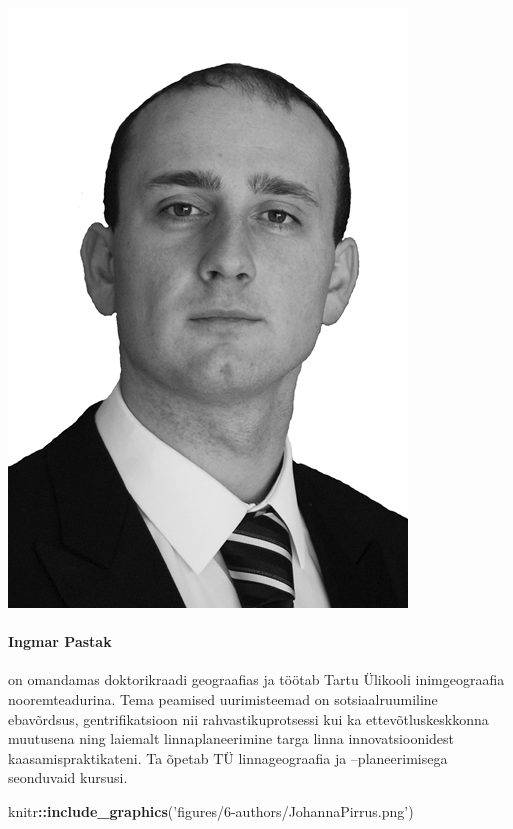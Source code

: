 \documentclass[estonian,]{article}
\newenvironment{Shaded}{\begin{snugshade}}{\end{snugshade}}
\newcommand{\KeywordTok}[1]{\textcolor[rgb]{0.13,0.29,0.53}{\textbf{#1}}}
\newcommand{\NormalTok}[1]{#1}
\newcommand{\OperatorTok}[1]{\textcolor[rgb]{0.81,0.36,0.00}{\textbf{#1}}}
\newcommand{\StringTok}[1]{\textcolor[rgb]{0.31,0.60,0.02}{#1}}
\let\oldparagraph\paragraph
\renewcommand{\paragraph}[1]{\oldparagraph{#1}\mbox{}}
\begin{document}
\begin{flushleft}\includegraphics[width=0.5\linewidth]{figures/6-authors/IngmarPastak} \end{flushleft}

\hypertarget{ingmar-pastak}{%
\paragraph{Ingmar Pastak}\label{ingmar-pastak}}

on omandamas doktorikraadi geograafias ja töötab Tartu Ülikooli inimgeograafia nooremteadurina. Tema peamised uurimisteemad on sotsiaalruumiline ebavõrdsus, gentrifikatsioon nii rahvastikuprotsessi kui ka ettevõtluskeskkonna muutusena ning laiemalt linnaplaneerimine targa linna innovatsioonidest kaasamispraktikateni. Ta õpetab TÜ linnageograafia ja --planeerimisega seonduvaid kursusi.

\begin{Shaded}
\begin{Highlighting}[]
\NormalTok{knitr}\OperatorTok{::}\KeywordTok{include_graphics}\NormalTok{(}\StringTok{'figures/6-authors/JohannaPirrus.png'}\NormalTok{)}
\end{Highlighting}
\end{Shaded}
\end{document}
